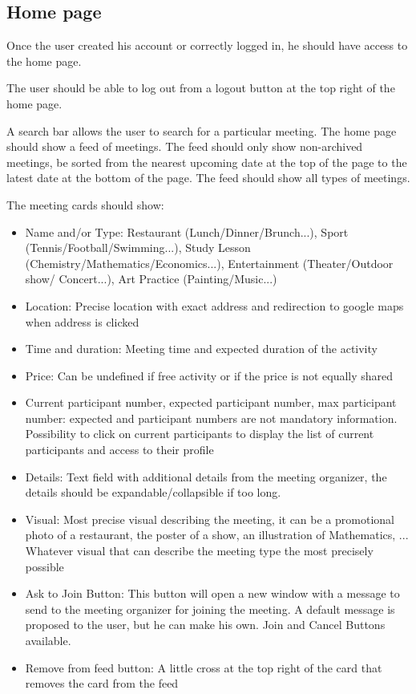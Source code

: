 \documentclass[conference]{IEEEtran}
\begin{document}
\subsection{Home page}

Once the user created his account or correctly logged in, he should have access to the home page.

The user should be able to log out from a logout button at the top right of the home page.

A search bar allows the user to search for a particular meeting.
The home page should show a feed of meetings. The feed should only show non-archived meetings, be sorted from the nearest upcoming date at the top of the page to the latest date at the bottom of the page. The feed should show all types of meetings.

The meeting cards should show:

\begin{itemize}
\item Name and/or Type: Restaurant
(Lunch/Dinner/Brunch...), Sport (Tennis/Football/Swimming...), Study Lesson (Chemistry/Mathematics/Economics...), Entertainment (Theater/Outdoor show/ Concert...), Art Practice (Painting/Music...)
\item Location: Precise location with exact address and redirection to google maps when address is clicked
\item Time and duration: Meeting time and expected duration
of the activity
\item Price: Can be undefined if free activity or if the price is
not equally shared
\item Current participant number, expected participant
number, max participant number: expected and participant numbers are not mandatory information.
Possibility to click on current participants to display the
list of current participants and access to their profile
\item Details: Text field with additional details from the meeting organizer, the details should be
expandable/collapsible if too long.
\item Visual: Most precise visual describing the meeting, it can
be a promotional photo of a restaurant, the poster of a show, an illustration of Mathematics, ... Whatever visual that can describe the meeting type the most precisely possible
\item Ask to Join Button: This button will open a new window with a message to send to the meeting organizer for joining the meeting. A default message is proposed to the user, but he can make his own. Join and Cancel Buttons available.
\item Remove from feed button: A little cross at the top right of the card that removes the card from the feed
\end{itemize}
\end{document}
